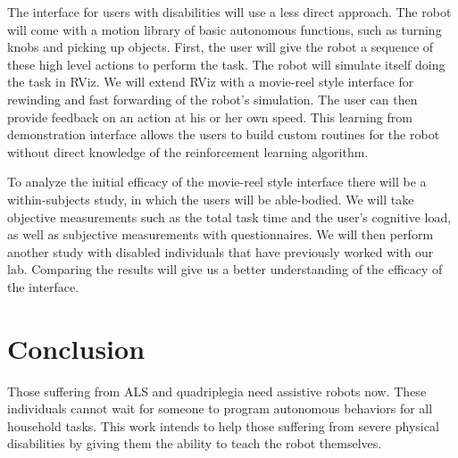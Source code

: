 \documentclass[letterpaper]{article}
\begin{document}
The interface for users with disabilities will use a less direct approach. The robot will come with a motion library of basic autonomous functions, such as turning knobs and picking up objects. First, the user will give the robot a sequence of these high level actions to perform the task. The robot will simulate itself doing the task in RViz. We will extend RViz with a movie-reel style interface for rewinding and fast forwarding of the robot's simulation. The user can then provide feedback on an action at his or her own speed. This learning from demonstration interface allows the users to build custom routines for the robot without direct knowledge of the reinforcement learning algorithm.

To analyze the initial efficacy of the movie-reel style interface there will be a within-subjects study, in which the users will be able-bodied. We will take objective measurements such as the total task time and the user's cognitive load, as well as subjective measurements with questionnaires. We will then perform another study with disabled individuals that have previously worked with our lab. Comparing the results will give us a better understanding of the efficacy of the interface.



\section{Conclusion}

Those suffering from ALS and quadriplegia need assistive robots now. These individuals cannot wait for someone to program autonomous behaviors for all household tasks.  This work intends to help those suffering from severe physical disabilities by giving them the ability to teach the robot themselves.
\end{document}
